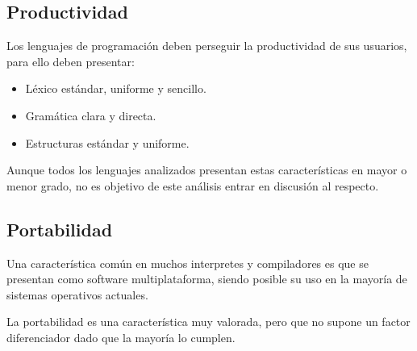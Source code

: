 \subsection{Productividad}
Los lenguajes de programación deben perseguir la productividad de sus usuarios, para ello deben presentar: 
\begin{itemize}
\item Léxico estándar, uniforme y sencillo.
\item Gramática clara y directa.
\item Estructuras estándar y uniforme.
\end{itemize}

Aunque todos los lenguajes analizados presentan estas características en mayor o menor grado, no es objetivo 
de este análisis entrar en discusión al respecto.

\subsection{Portabilidad}
Una característica común en muchos interpretes y compiladores es que se presentan como software multiplataforma,
siendo posible su uso en la mayoría de sistemas operativos actuales. 

La portabilidad es una característica muy valorada, pero que no supone un factor diferenciador dado que la mayoría 
lo cumplen. 

